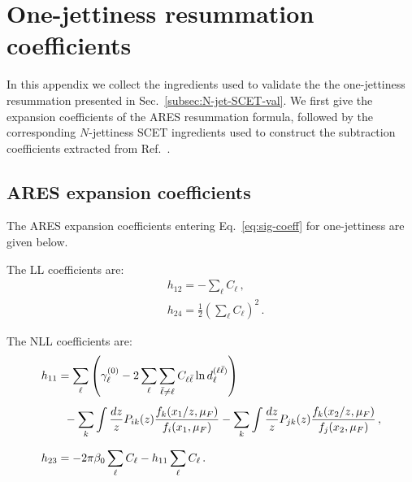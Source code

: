 \chapter{One-jettiness resummation coefficients}
\label{ap:coefficients}

In this appendix we collect the ingredients used to validate the
the one-jettiness resummation presented in Sec.~\ref{subsec:N-jet-SCET-val}.
We first give the expansion coefficients of the \textsc{ARES} resummation
formula, followed by the corresponding $N$-jettiness SCET ingredients
used to construct the subtraction coefficients extracted from Ref.~\cite{Gaunt:2015pea}.

\section{ARES expansion coefficients}
The \textsc{ARES} expansion coefficients entering Eq.~\eqref{eq:sig-coeff}
for one-jettiness are given below.

The LL coefficients are:
\begin{subequations}
\begin{align}
\label{eq:h12}
&h_{12} =-\sum_{\ell}C_{\ell}\,,\\[1ex]
\label{eq:h24}
&h_{24}=\frac{1}{2}\left(\sum_{\ell}C_{\ell}\right)^2\,.
 \end{align}
\end{subequations}

The NLL coefficients are: 
\begin{subequations}
\begin{align}
\label{eq:h11}
&h_{11} = \sum_{\ell}\left(\gamma_{\ell}^{(0)}-2\sum_{\ell}\sum_{\bar\ell\neq\ell} C_{\ell\bar\ell}\ln  d^{(\ell\bar{\ell})}_\ell\right)\notag\\[1ex]
&\qquad-\sum_{k}\int\frac{dz}{z}P_{ik}(z)\frac{f_k(x_1/z,\mu_F)}{f_i(x_1,\mu_F)}-\sum_{k}\int\frac{dz}{z}P_{jk}(z)\frac{f_k(x_2/z,\mu_F)}{f_j(x_2,\mu_F)}\,,\\[1.5ex]
\label{eq:h23}
&h_{23}=-2\pi\beta_{0} \sum_{\ell}C_{\ell }-h_{11} \sum_{\ell}C_{\ell }\,.
 \end{align}
\end{subequations}

